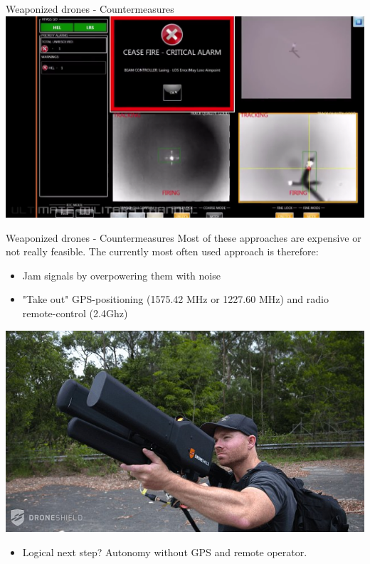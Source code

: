 \documentclass[aspectratio=169]{beamer}
\begin{document}
\begin{frame}{Weaponized drones - Countermeasures}
\centering
            \href{run:./videos/LawsAntiDroneLaser.mp4?autostart}
            {\includegraphics[width=.98\linewidth]{images/LawsAntiDroneLaser.png}}
\end{frame}

\begin{frame}{Weaponized drones - Countermeasures}
	Most of these approaches are expensive or not really feasible. The currently most often used approach is therefore:
	\begin{itemize}
		\item Jam signals by overpowering them with noise
		\item "Take out" GPS-positioning (1575.42 MHz or 1227.60 MHz) and radio remote-control (2.4Ghz)
	\end{itemize}

\centering
\includegraphics[width=.4\textwidth]{images/drone_jammer.jpg}
	\begin{itemize}
		\item Logical next step? Autonomy without GPS and remote operator.
	\end{itemize}

\tiny{\color{gray}{http://www.dailymail.co.uk/sciencetech/article-3978762/The-death-ray-knock-drones-mile-away-Rifle-uses-radio-waves-kill-UAVs.html}}
\end{frame}
\end{document}
